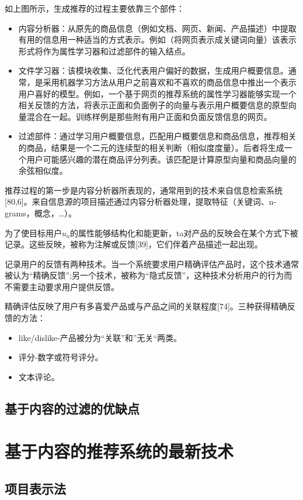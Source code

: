 如上图所示，生成推荐的过程主要依靠三个部件：
\begin{itemize}
	\item 内容分析器：从原先的商品信息（例如文档、网页、新闻、产品描述）中提取有用的信息用一种适当的方式表示。例如（将网页表示成关键词向量）该表示形式将作为属性学习器和过滤部件的输入结点。
	\item 文件学习器：该模块收集、泛化代表用户偏好的数据，生成用户概要信息。通常，是采用机器学习方法从用户之前喜欢和不喜欢的商品信息中推出一个表示用户喜好的模型。例如，一个基于网页的推荐系统的属性学习器能够实现一个相关反馈的方法，将表示正面和负面例子的向量与表示用户概要信息的原型向量混合在一起。训练样例是那些附有用户正面和负面反馈信息的网页。
	\item  过滤部件：通过学习用户概要信息，匹配用户概要信息和商品信息，推荐相关的商品，结果是一个二元的连续型的相关判断（相似度度量）。后者将生成一个用户可能感兴趣的潜在商品评分列表。该匹配是计算原型向量和商品向量的余弦相似度。
\end{itemize} 

推荐过程的第一步是内容分析器所表现的，通常用到的技术来自信息检索系统[80,6]。来自信息源的项目描述通过内容分析器处理，提取特征（关键词、n-grams，概念，\dots）。

为了使目标用户$ u_a $的属性能够结构化和能更新，ta对产品的反映会在某个方式下被记录。这些反映，被称为注解或反馈[39]，它们伴着产品描述一起出现。

记录用户的反馈有两种技术。当一个系统要求用户精确评估产品时，这个技术通常被认为“精确反馈”;另一个技术，被称为“隐式反馈”，这种技术分析用户的行为而不需要主动要求用户提供反馈。

精确评估反映了用户有多喜爱产品或与产品之间的关联程度[74]。三种获得精确反馈的方法：
\begin{itemize}
	\item like/dislike-产品被分为“关联”和”无关“两类。 
	\item 评分-数字或符号评分。
	\item 文本评论。
\end{itemize}

\subsection{基于内容的过滤的优缺点}

\section{基于内容的推荐系统的最新技术}

\subsection{项目表示法}

